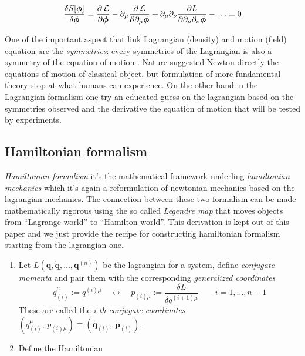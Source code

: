 \begin{equation} \label{eq:euler-lagrange-field}
  \frac{\delta S[\bm{\phi}]}{\delta \bm{\phi}} =
    \frac{\partial \operatorname{\mathcal{L}}}{\partial \bm{\phi}} -
    \partial_{\mu} \frac{\partial \operatorname{\mathcal{L}}}{\partial \partial_{\mu}\bm{\phi}} +
    \partial_{\mu}\partial_{\nu}\frac{\partial L}
    {\partial \partial_{\mu}\partial_{\nu}\bm{\phi}} -
    \ldots = 0
\end{equation}

One of the important aspect that link Lagrangian (density) and motion (field)
equation are the \emph{symmetries}: every symmetries of the Lagrangian is also a
symmetry of the equation of motion \cite{Aldrovandi19_symmetry}. Nature
suggested Newton directly the equations of motion of classical object, but
formulation of more fundamental theory stop at what humans can experience. On
the other hand in the Lagrangian formalism one try an educated guess on the
lagrangian based on the symmetries observed and the derivative the equation of
motion that will be tested by experiments.


\subsection{Hamiltonian formalism}
\emph{Hamiltonian formalism} it's the mathematical framework underling
\emph{hamiltonian mechanics} which it's again a reformulation of newtonian
mechanics based on the lagrangian mechanics. The connection between these two
formalism can be made mathematically rigorous using the so called \emph{Legendre
map} that moves objects from ``Lagrange-world'' to ``Hamilton-world''. This
derivation is kept out of this paper and we just provide the recipe for
constructing hamiltonian formalism starting from the lagrangian one.

\begin{enumerate}
  \item Let $L(\bm{q}, \dot{\bm{q}}, \ldots, \bm{q}^{(n)})$ be the lagrangian
    for a system, define \emph{conjugate momenta} and pair them with the
    corresponding \emph{generalized coordinates}
    \begin{equation}
      q_{(i)}^{\mu} := q^{(i)\mu}
      \quad \leftrightarrow \quad
      p_{(i)\mu} := \frac{\delta L}{\delta q^{(i+1)\mu}}
      \qquad i = 1, \ldots, n-1
    \end{equation}
    These are called the \emph{i-th conjugate coordinates}
    $(q_{(i)}^{\mu}, \, p_{(i)\mu}) \equiv (\bm{q}_{(i)}, \, \bm{p}_{(i)})$.

  \item Define the Hamiltonian
\end{enumerate}
